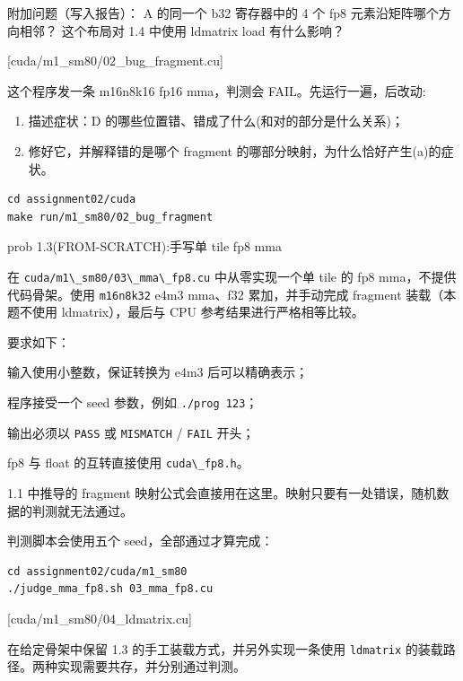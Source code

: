 \documentclass[11pt,a4paper,fontset=none]{ctexart}
\providecommand{\passthrough}[1]{#1}
\begin{document}
附加问题（写入报告）： A 的同一个 b32 寄存器中的 4 个 fp8
元素沿矩阵哪个方向相邻？ 这个布局对 1.4 中使用 ldmatrix load
有什么影响？

[cuda/m1\_sm80/02\_bug\_fragment.cu]

这个程序发一条 m16n8k16 fp16 mma，判测会 FAIL。先运行一遍，后改动:

\begin{enumerate}
\def\labelenumi{(\alph{enumi})}
\item
  描述症状：D 的哪些位置错、错成了什么(和对的部分是什么关系)；
\item
  修好它，并解释错的是哪个 fragment
  的哪部分映射，为什么恰好产生(a)的症状。
\end{enumerate}

\begin{lstlisting}
cd assignment02/cuda
make run/m1_sm80/02_bug_fragment
\end{lstlisting}

\begin{capstone}{prob 1.3(FROM-SCRATCH):手写单 tile fp8 mma}

在 \passthrough{\lstinline!cuda/m1\_sm80/03\_mma\_fp8.cu!}
中从零实现一个单 tile 的 fp8 mma，不提供代码骨架。使用
\passthrough{\lstinline!m16n8k32!} e4m3 mma、f32 累加，并手动完成
fragment 装载（本题不使用 ldmatrix），最后与 CPU
参考结果进行严格相等比较。

要求如下：

输入使用小整数，保证转换为 e4m3 后可以精确表示；

程序接受一个 seed 参数，例如 \passthrough{\lstinline!./prog 123!}；

输出必须以 \passthrough{\lstinline!PASS!} 或
\passthrough{\lstinline!MISMATCH!} / \passthrough{\lstinline!FAIL!}
开头；

fp8 与 float 的互转直接使用 \passthrough{\lstinline!cuda\_fp8.h!}。

1.1 中推导的 fragment
映射公式会直接用在这里。映射只要有一处错误，随机数据的判测就无法通过。

判测脚本会使用五个 seed，全部通过才算完成：

\begin{lstlisting}
cd assignment02/cuda/m1_sm80
./judge_mma_fp8.sh 03_mma_fp8.cu
\end{lstlisting}

\end{capstone}

[cuda/m1\_sm80/04\_ldmatrix.cu]

在给定骨架中保留 1.3 的手工装载方式，并另外实现一条使用
\passthrough{\lstinline!ldmatrix!}
的装载路径。两种实现需要共存，并分别通过判测。
\end{document}

